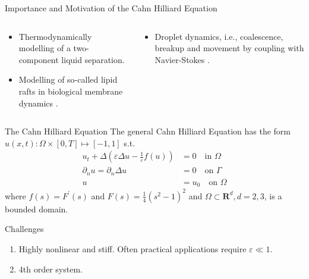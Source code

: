 \begin{frame}{Importance and Motivation of the Cahn Hilliard Equation}
    \begin{columns}
        \begin{column}{0.5\textwidth}
            \begin{itemize}
                \item Thermodynamically modelling of a two-component liquid separation\footnotemark[1].
            \item Modelling of so-called lipid rafts in biological membrane dynamics \footnotemark[2].
            \end{itemize}
        \end{column}
        \begin{column}{0.5\textwidth}
            \begin{itemize}
                \item Droplet dynamics, i.e., coalescence, breakup and movement by coupling with Navier-Stokes \footnotemark[3].
            \end{itemize}
        \end{column}
    \end{columns}
\end{frame}

\begin{frame}
    \begin{block}{The Cahn Hilliard Equation}
        The general Cahn Hilliard Equation  has the form $u( x, t): \Omega \times [0,T] \mapsto [-1,1]   $ s.t.
            \[
            \begin{split}
                 u_t+\Delta\left(\varepsilon \Delta u-\frac{1}{\varepsilon} f(u)\right)&=0 \quad \text{in } \Omega \\
\partial_n u=\partial_n \Delta u& =0 \quad \text{on } \Gamma  \\
 u & =u_0 \quad \text{on } \Omega
            \end{split}
            \]
where $f(s)=F^{\prime}(s)$ and $F(s)=\frac{1}{4}\left(s^2-1\right)^2$ and $\Omega \subset \mathbf{R}^d, d=2,3$, is a bounded domain.
\end{block}

\begin{block}{Challenges}
    \begin{enumerate}
        \item Highly nonlinear and stiff. Often practical applications require $\varepsilon \ll 1$.
        \item 4th order system.
    \end{enumerate}
\end{block}

\end{frame}

